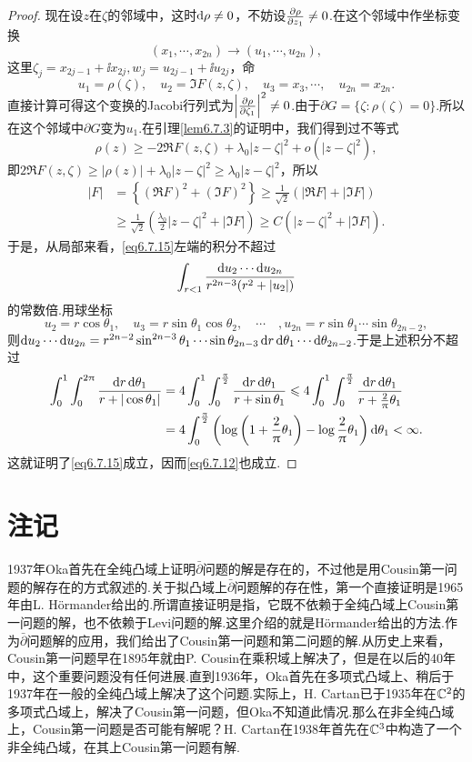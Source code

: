 \begin{proof}
	现在设$z$在$\zeta$的邻域中，这时$\mathop{}\!\mathrm{d}\rho\neq0$，不妨设$\frac{\partial \rho}{\partial z_1}\neq0$.在这个邻域中作坐标变换
	\[(x_1,\cdots,x_{2n})\to(u_1,\cdots,u_{2n}),\]
	这里$\zeta_j=x_{2j-1}+\ii x_{2j},w_j=u_{2j-1}+\ii u_{2j}$，命
	\[u_1=\rho(\zeta),\quad u_2=\Im F(z,\zeta),\quad u_3=x_3,\cdots,\quad u_{2n}=x_{2n}.\]
	直接计算可得这个变换的Jacobi行列式为$\left|\frac{\partial \rho}{\partial \zeta_1}\right|^2\neq0$.由于$\partial G=\{\zeta\colon\rho(\zeta)=0\}$.所以在这个邻域中$\partial G$变为$u_1$.在引理\ref{lem6.7.3}的证明中，我们得到过不等式
	\[\rho(z)\ge-2\Re F(z,\zeta)+\lambda_0|z-\zeta|^2+o(|z-\zeta|^2),\]
	即$2\Re F(z,\zeta)\ge|\rho(z)|+\lambda_0|z-\zeta|^2\ge\lambda_0|z-\zeta|^2$，所以
	\begin{align*}
		|F|
		&=\left\{(\Re F)^2+(\Im F)^2\right\}\ge\frac1{\sqrt{2}}(|\Re F|+|\Im F|)\\
		&\ge\frac1{\sqrt{2}}\left(\frac{\lambda_0}{2}|z-\zeta|^2+|\Im F|\right)\ge C(|z-\zeta|^2+|\Im F|).
	\end{align*}
	于是，从局部来看，\eqref{eq6.7.15}左端的积分不超过
	\[\int_{r<1}\frac{\mathop{}\!\mathrm{d} u_2\cdots\mathop{}\!\mathrm{d} u_{2n}}{r^{2n-3}(r^2+|u_2|)}\]
	的常数倍.用球坐标
	\[u_2=r\cos\theta_1,\quad u_3=r\sin\theta_1\cos\theta_2,\quad\cdots\quad,u_{2n}=r\sin\theta_1\cdots\sin\theta_{2n-2},\]
	则$\mathop{}\!\mathrm{d} u_2\cdots\mathop{}\!\mathrm{d} u_{2n}=r^{2n-2}\sin^{2n-3}\theta_1\cdots\sin\theta_{2n-3}\mathop{}\!\mathrm{d} r\mathop{}\!\mathrm{d}\theta_1\cdots\mathop{}\!\mathrm{d}\theta_{2n-2}$.于是上述积分不超过
	\begin{align*}
		\int_{0}^{1}\int_{0}^{2\uppi}\frac{\mathop{}\!\mathrm{d} r\mathop{}\!\mathrm{d}\theta_1}{r+|\cos\theta_1|}
		&=4\int_{0}^{1}\int_{0}^{\frac{\uppi}{2}}\frac{\mathop{}\!\mathrm{d} r\mathop{}\!\mathrm{d}\theta_1}{r+\sin\theta_1}\leqslant4\int_{0}^{1}\int_{0}^{\frac{\uppi}{2}}\frac{\mathop{}\!\mathrm{d} r\mathop{}\!\mathrm{d}\theta_1}{r+\frac{2}{\uppi}\theta_1}\\
		&=4\int_{0}^{\frac{\uppi}{2}}\left(\log\left(1+\frac{2}{\uppi}\theta_1\right)-\log\frac{2}{\uppi}\theta_1\right)\mathop{}\!\mathrm{d}\theta_1<\infty.
	\end{align*}
	这就证明了\eqref{eq6.7.15}成立，因而\eqref{eq6.7.12}也成立.
\end{proof}
\section*{注记}
1937年Oka首先在全纯凸域上证明$\bar{\partial}$问题的解是存在的，不过他是用Cousin第一问题的解存在的方式叙述的.关于拟凸域上$\bar{\partial}$问题解的存在性，第一个直接证明是1965年由L. H\"ormander\cite{hormander19652}给出的.所谓直接证明是指，它既不依赖于全纯凸域上Cousin第一问题的解，也不依赖于Levi问题的解.这里介绍的就是H\"ormander给出的方法.作为$\bar{\partial}$问题解的应用，我们给出了Cousin第一问题和第二问题的解.从历史上来看，Cousin第一问题早在1895年就由P. Cousin在乘积域上解决了，但是在以后的40年中，这个重要问题没有任何进展.直到1936年，Oka首先在多项式凸域上、稍后于1937年在一般的全纯凸域上解决了这个问题.实际上，H. Cartan已于1935年在$\mathbb C^2$的多项式凸域上，解决了Cousin第一问题，但Oka不知道此情况.那么在非全纯凸域上，Cousin第一问题是否可能有解呢？H. Cartan\cite[536$\sim$538]{cartan1979collected}在1938年首先在$\mathbb C^3$中构造了一个非全纯凸域，在其上Cousin第一问题有解.

